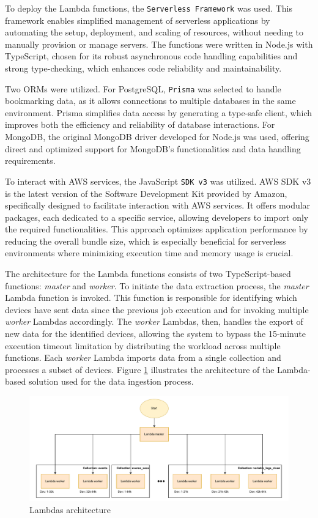 To deploy the Lambda functions, the \texttt{Serverless Framework} was used. This framework enables simplified management of serverless applications by automating the setup, deployment, and scaling of resources, without needing to manually provision or manage servers. The functions were written in Node.js with TypeScript, chosen for its robust asynchronous code handling capabilities and strong type-checking, which enhances code reliability and maintainability.

Two \acp{ORM} were utilized. For PostgreSQL, \texttt{Prisma} was selected to handle bookmarking data, as it allows connections to multiple databases in the same environment. Prisma simplifies data access by generating a type-safe client, which improves both the efficiency and reliability of database interactions. For MongoDB, the original MongoDB driver developed for Node.js was used, offering direct and optimized support for MongoDB's functionalities and data handling requirements.

To interact with \ac{AWS} services, the JavaScript \texttt{\ac{SDK} v3} was utilized. \ac{AWS} \ac{SDK} v3 is the latest version of the Software Development Kit provided by Amazon, specifically designed to facilitate interaction with \ac{AWS} services. It offers modular packages, each dedicated to a specific service, allowing developers to import only the required functionalities. This approach optimizes application performance by reducing the overall bundle size, which is especially beneficial for serverless environments where minimizing execution time and memory usage is crucial.

The architecture for the Lambda functions consists of two TypeScript-based functions: \textit{master} and \textit{worker}. To initiate the data extraction process, the \textit{master} Lambda function is invoked. This function is responsible for identifying which devices have sent data since the previous job execution and for invoking multiple \textit{worker} Lambdas accordingly. The \textit{worker} Lambdas, then, handles the export of new data for the identified devices, allowing the system to bypass the 15-minute execution timeout limitation by distributing the workload across multiple functions. Each \textit{worker} Lambda imports data from a single collection and processes a subset of devices. Figure \ref{fig:lamschema} illustrates the architecture of the Lambda-based solution used for the data ingestion process.
\begin{figure}[H]
    \centering
    \includegraphics[width=1\textwidth]{res/lambda-schema.pdf}
    \caption{Lambdas architecture}
    \label{fig:lamschema}
\end{figure}

